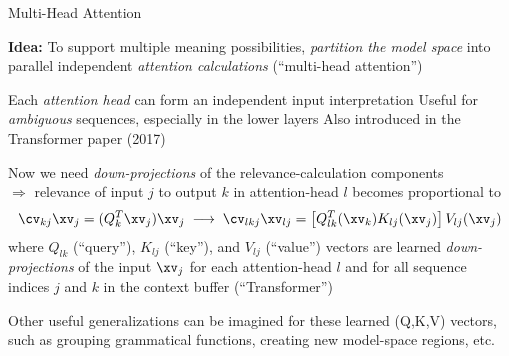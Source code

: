 




\begin{slide}[\slideopts]{Multi-Head Attention}

\textbf{Idea:} To support multiple meaning possibilities, \emph{partition the model space} into\\
parallel independent \emph{attention calculations} (``multi-head attention'')


\begin{itemize}
  \mpitem Each \emph{attention head} can form an independent input interpretation
  \mpitem Useful for \emph{ambiguous} sequences, especially in the lower layers
  \mpitem Also introduced in the Transformer paper (2017)
\end{itemize}

\maybepause

Now we need \emph{down-projections} of the relevance-calculation components\\
$\Rightarrow$ relevance of input $j$ to output $k$ in attention-head $l$ becomes proportional to
\[
\cv_{kj}\xv_j = (Q_k^T \xv_j)\xv_j \;\longrightarrow\; \cv_{lkj}\xv_{lj} = \left[Q_{lk}^T(\xv_k) K_{lj}(\xv_{j})\right]V_{lj}(\xv_j)
\]
where $Q_{lk}$ (``query''), $K_{lj}$ (``key''), and $V_{lj}$
(``value'') vectors are learned \emph{down-projections} of the input $\xv_j$
for each attention-head $l$ and for all sequence indices $j$ and $k$
in the context buffer (``Transformer'')



\maybepause

Other useful generalizations can be imagined for these learned (Q,K,V)
vectors, such as grouping grammatical functions, creating new
model-space regions, etc.

\end{slide}


